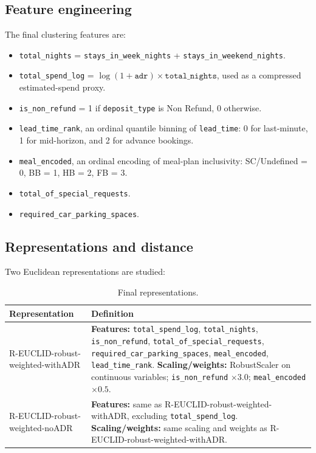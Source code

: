 \documentclass[11pt,a4paper]{article}
\newcommand{\withadr}{R-EUCLID-robust-weighted-withADR}
\newcommand{\noadr}{R-EUCLID-robust-weighted-noADR}
\begin{document}
\subsection{Feature engineering}
The final clustering features are:
\begin{itemize}
    \item \texttt{total\_nights} = \texttt{stays\_in\_week\_nights} + \texttt{stays\_in\_weekend\_nights}.
    \item \texttt{total\_spend\_log} = $\log(1+\texttt{adr}) \times \texttt{total\_nights}$, used as a compressed estimated-spend proxy.
    \item \texttt{is\_non\_refund} = 1 if \texttt{deposit\_type} is Non Refund, 0 otherwise.
    \item \texttt{lead\_time\_rank}, an ordinal quantile binning of \texttt{lead\_time}: 0 for last-minute, 1 for mid-horizon, and 2 for advance bookings.
    \item \texttt{meal\_encoded}, an ordinal encoding of meal-plan inclusivity: SC/Undefined = 0, BB = 1, HB = 2, FB = 3.
    \item \texttt{total\_of\_special\_requests}.
    \item \texttt{required\_car\_parking\_spaces}.
\end{itemize}

\subsection{Representations and distance}
Two Euclidean representations are studied:
\begin{table}[H]
\centering
\caption{Final representations.}
\label{tab:representations}
\small
\begin{tabularx}{\textwidth}{p{}X}
\toprule
\textbf{Representation} & \textbf{Definition} \\
\midrule

\withadr{} &
\textbf{Features:} 
\texttt{total\_spend\_log}, 
\texttt{total\_nights}, 
\texttt{is\_non\_refund}, 
\texttt{total\_of\_special\_requests}, 
\texttt{required\_car\_parking\_spaces}, 
\texttt{meal\_encoded}, 
\texttt{lead\_time\_rank}.
\newline
\textbf{Scaling/weights:} RobustScaler on continuous variables; 
\texttt{is\_non\_refund} $\times 3.0$; 
\texttt{meal\_encoded} $\times 0.5$. \\

\addlinespace

\noadr{} &
\textbf{Features:} same as \withadr{}, excluding 
\texttt{total\_spend\_log}.
\newline
\textbf{Scaling/weights:} same scaling and weights as \withadr{}. \\

\bottomrule
\end{tabularx}
\end{table}
\end{document}
